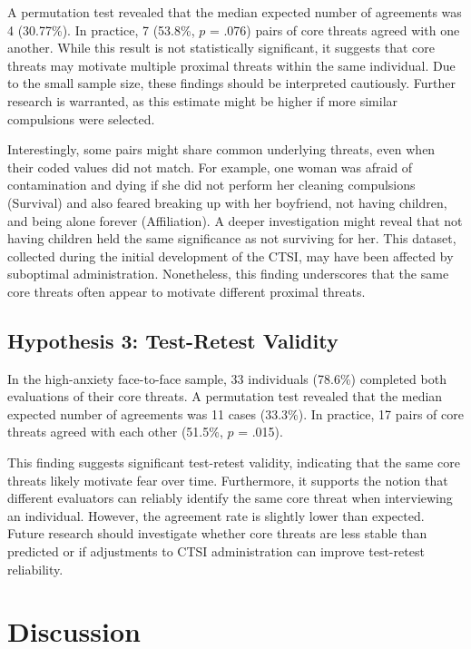 \documentclass[
  man,floatsintext]{apa7}
\begin{document}
A permutation test revealed that the median expected number of agreements was 4 (30.77\%).
In practice, 7 (53.8\%, \(p\) = .076) pairs of core threats agreed with one another.
While this result is not statistically significant, it suggests that core threats may motivate multiple proximal threats within the same individual.
Due to the small sample size, these findings should be interpreted cautiously.
Further research is warranted, as this estimate might be higher if more similar compulsions were selected.

Interestingly, some pairs might share common underlying threats, even when their coded values did not match.
For example, one woman was afraid of contamination and dying if she did not perform her cleaning compulsions (Survival) and also feared breaking up with her boyfriend, not having children, and being alone forever (Affiliation).
A deeper investigation might reveal that not having children held the same significance as not surviving for her.
This dataset, collected during the initial development of the CTSI, may have been affected by suboptimal administration.
Nonetheless, this finding underscores that the same core threats often appear to motivate different proximal threats.

\subsection{Hypothesis 3: Test-Retest Validity}\label{hypothesis-3-test-retest-validity}

In the high-anxiety face-to-face sample, 33 individuals (78.6\%) completed both evaluations of their core threats.
A permutation test revealed that the median expected number of agreements was 11 cases (33.3\%).
In practice, 17 pairs of core threats agreed with each other (51.5\%, \(p\) = .015).

This finding suggests significant test-retest validity, indicating that the same core threats likely motivate fear over time.
Furthermore, it supports the notion that different evaluators can reliably identify the same core threat when interviewing an individual.
However, the agreement rate is slightly lower than expected.
Future research should investigate whether core threats are less stable than predicted or if adjustments to CTSI administration can improve test-retest reliability.

\section{Discussion}\label{discussion}
\end{document}
